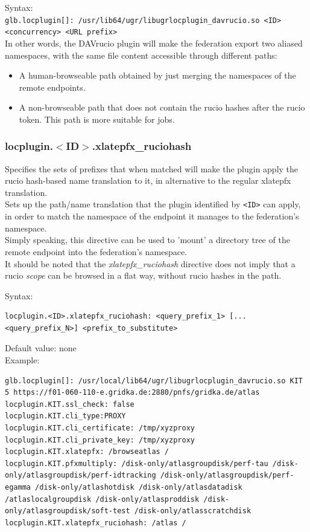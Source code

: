 \documentclass[12pt]{article} %
\begin{document}
Syntax:\\
\lstinline"glb.locplugin[]: /usr/lib64/ugr/libugrlocplugin_davrucio.so <ID> <concurrency> <URL prefix>"\\

In other words, the DAVrucio plugin will make the federation export two aliased namespaces, with the same file content accessible through different paths:
\begin{itemize}
 \item A human-browseable path obtained by just merging the namespaces of the remote endpoints.
 \item A non-browseable path that does not contain the rucio hashes after the rucio token. This path is more suitable for jobs.
\end{itemize}


\subsubsection{locplugin.$<$ID$>$.xlatepfx\_ruciohash}

Specifies the sets of prefixes that when matched will make the plugin apply the rucio hash-based name translation to it, in alternative to the regular xlatepfx translation.\\
Sets up the path/name translation that the plugin identified by \lstinline"<ID>" can apply, in order to match the namespace of the endpoint it manages to the federation's namespace.\\
Simply speaking, this directive can be used to 'mount' a directory tree of the remote endpoint into the federation's namespace.\\

It should be noted that the \textit{xlatepfx\_ruciohash} directive does not imply that a rucio \textit{scope} can be browsed in a flat way, without rucio hashes in the path.


Syntax:\\
\begin{lstlisting}
locplugin.<ID>.xlatepfx_ruciohash: <query_prefix_1> [... <query_prefix_N>] <prefix_to_substitute>
\end{lstlisting}

Default value: none\\

Example:\\
\begin{lstlisting}
glb.locplugin[]: /usr/local/lib64/ugr/libugrlocplugin_davrucio.so KIT 5 https://f01-060-110-e.gridka.de:2880/pnfs/gridka.de/atlas
locplugin.KIT.ssl_check: false
locplugin.KIT.cli_type:PROXY
locplugin.KIT.cli_certificate: /tmp/xyzproxy
locplugin.KIT.cli_private_key: /tmp/xyzproxy
locplugin.KIT.xlatepfx: /browseatlas /
locplugin.KIT.pfxmultiply: /disk-only/atlasgroupdisk/perf-tau /disk-only/atlasgroupdisk/perf-idtracking /disk-only/atlasgroupdisk/perf-egamma /disk-only/atlashotdisk /disk-only/atlasdatadisk /atlaslocalgroupdisk /disk-only/atlasproddisk /disk-only/atlasgroupdisk/soft-test /disk-only/atlasscratchdisk
locplugin.KIT.xlatepfx_ruciohash: /atlas /
\end{lstlisting}
\end{document}
